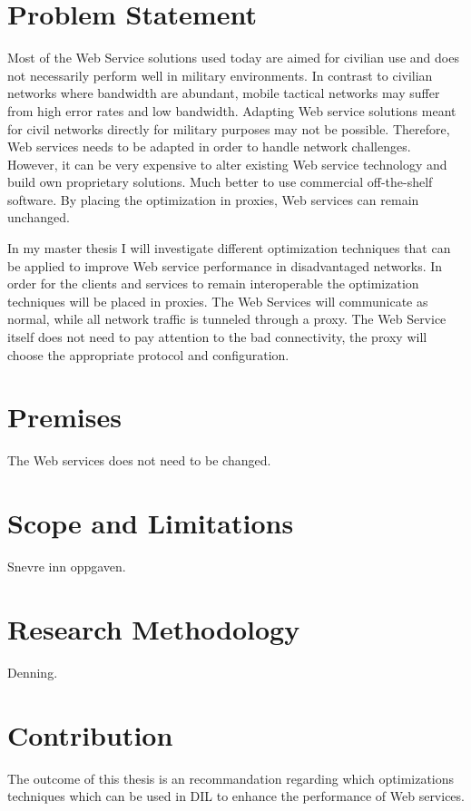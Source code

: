 \documentclass[USenglish]{article}
\begin{document}
\section{Problem Statement}
Most of the Web Service solutions used today are aimed for civilian use and does not necessarily perform well in military environments. In contrast to civilian networks where bandwidth are abundant, mobile tactical networks may suffer from high error rates and low bandwidth. Adapting Web service solutions meant for civil networks directly for military purposes may not be possible. Therefore, Web services needs to be adapted in order to handle network challenges. However, it can be very expensive to alter existing Web service technology and build own proprietary solutions. Much better to use commercial off-the-shelf software. By placing the optimization in proxies, Web services can remain unchanged.

In my master thesis I will investigate different optimization techniques that can be applied to improve Web service performance in disadvantaged networks. In order for the clients and services to remain interoperable the optimization techniques will be placed in proxies. The Web Services will communicate as normal, while all network traffic is tunneled through a proxy. The Web Service itself does not need to pay attention to the bad connectivity, the proxy will choose the appropriate protocol and configuration.

\section{Premises}
The Web services does not need to be changed. 

\section{Scope and Limitations}
Snevre inn oppgaven.

\section{Research Methodology}
Denning.

\section{Contribution}
The outcome of this thesis is an recommandation regarding which optimizations techniques which can be used in DIL to enhance the performance of Web services.
\end{document}
